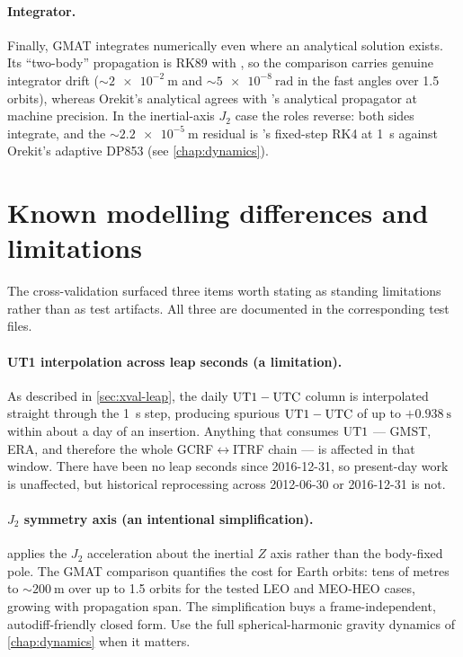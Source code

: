 \paragraph{Integrator.} Finally, GMAT integrates numerically even where an
analytical solution exists. Its ``two-body'' propagation is RK89 with
, so the  comparison carries genuine
integrator drift (${\sim}\SI{2e-2}{\meter}$ and ${\sim}\SI{5e-8}{\radian}$ in
the fast angles over 1.5 orbits), whereas Orekit's analytical
 agrees with \lupnt{}'s analytical propagator at
machine precision. In the inertial-axis $J_2$ case the roles reverse: both
sides integrate, and the ${\sim}\SI{2.2e-5}{\meter}$ residual is \lupnt{}'s
fixed-step RK4 at \SI{1}{\second} against Orekit's adaptive DP853 (see
\cref{chap:dynamics}).

\section{Known modelling differences and limitations}
\label{sec:xval-limitations}

The cross-validation surfaced three items worth stating as standing
limitations rather than as test artifacts. All three are documented in the
corresponding test files.

\paragraph{UT1 interpolation across leap seconds (a \lupnt{} limitation).}
As described in \cref{sec:xval-leap}, the daily $\mathrm{UT1}-\mathrm{UTC}$ column is
interpolated straight through the \SI{1}{\second} step, producing spurious
$\mathrm{UT1}-\mathrm{UTC}$ of up to $+\SI{0.938}{\second}$ within about a day of an
insertion. Anything that consumes $\mathrm{UT1}$ --- GMST, ERA, and therefore the
whole GCRF$\leftrightarrow$ITRF chain --- is affected in that window. There
have been no leap seconds since 2016-12-31, so present-day work is unaffected,
but historical reprocessing across 2012-06-30 or 2016-12-31 is not.

\paragraph{$J_2$ symmetry axis (an intentional simplification).}
 applies the $J_2$ acceleration about the inertial
$Z$ axis rather than the body-fixed pole. The GMAT comparison quantifies the
cost for Earth orbits: tens of metres to ${\sim}\SI{200}{\meter}$ over up to
1.5 orbits for the tested LEO and MEO-HEO cases, growing with propagation
span. The simplification buys a frame-independent, autodiff-friendly closed
form. Use the full spherical-harmonic gravity dynamics of
\cref{chap:dynamics} when it matters.

